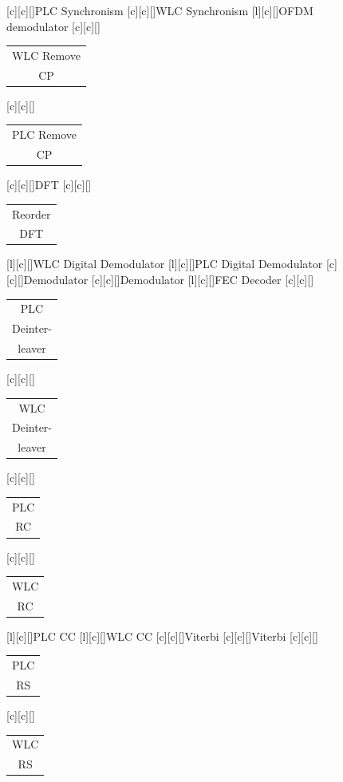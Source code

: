 \documentclass[mathserif]{beamer}
\begin{document}
\begin{frame}
\begin{overprint}
{\begin{figure}[htb]
				[c][c][\sizeLetter]{PLC Synchronism}
				[c][c][\sizeLetter]{WLC Synchronism}
				[l][c][\sizeLetter]{OFDM demodulator}
				[c][c][\sizeLetter]{\begin{tabular}{c}
						WLC Remove\\CP
				\end{tabular}}
				[c][c][\sizeLetter]{\begin{tabular}{c}
						PLC Remove\\CP
				\end{tabular}}
				[c][c][\sizeLetter]{DFT}
				[c][c][\sizeLetter]{\begin{tabular}{c}
						Reorder\\DFT
				\end{tabular}}
				[l][c][\sizeLetter]{WLC Digital Demodulator}
				[l][c][\sizeLetter]{PLC Digital Demodulator}
				[c][c][\sizeLetter]{Demodulator}
				[c][c][\sizeLetter]{Demodulator}
				[l][c][\sizeLetter]{FEC Decoder}
				[c][c][\sizeLetter]{\begin{tabular}{c}
						PLC\\Deinter-\\leaver
				\end{tabular}}
				[c][c][\sizeLetter]{\begin{tabular}{c}
						WLC\\Deinter-\\leaver
				\end{tabular}}
				[c][c][\sizeLetter]{\begin{tabular}{c}
						PLC\\RC
				\end{tabular}}
				[c][c][\sizeLetter]{\begin{tabular}{c}
						WLC\\RC
				\end{tabular}}
				[l][c][\sizeLetter]{PLC CC}
				[l][c][\sizeLetter]{WLC CC}
				[c][c][\sizeLetter]{Viterbi}
				[c][c][\sizeLetter]{Viterbi}
				[c][c][\sizeLetter]{\begin{tabular}{c}
						PLC\\RS
				\end{tabular}}
				[c][c][\sizeLetter]{\begin{tabular}{c}
						WLC\\RS
				\end{tabular}}

\end{figure}}
\end{overprint}
\end{frame}
\end{document}
